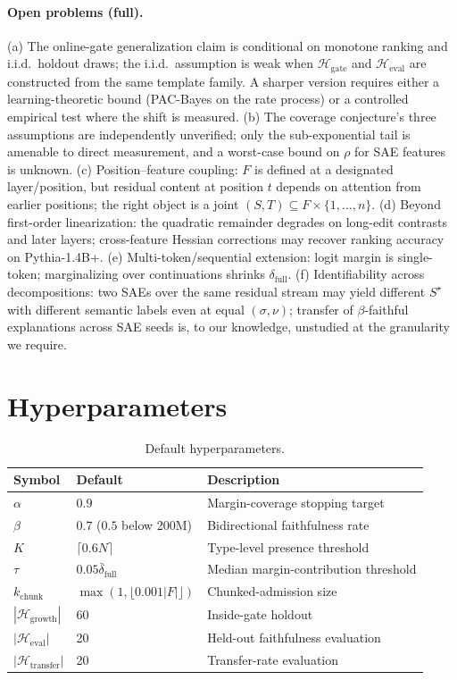 \documentclass[10pt]{article}
\begin{document}
\paragraph{Open problems (full).} (a) The online-gate generalization claim is conditional on monotone ranking and i.i.d.\ holdout draws; the i.i.d.\ assumption is weak when $\mathcal{H}_{\text{gate}}$ and $\mathcal{H}_{\text{eval}}$ are constructed from the same template family. A sharper version requires either a learning-theoretic bound (PAC-Bayes on the rate process) or a controlled empirical test where the shift is measured. (b) The coverage conjecture's three assumptions are independently unverified; only the sub-exponential tail is amenable to direct measurement, and a worst-case bound on $\rho$ for SAE features is unknown. (c) Position--feature coupling: $F$ is defined at a designated layer/position, but residual content at position $t$ depends on attention from earlier positions; the right object is a joint $(S, T) \subseteq F \times \{1, \dots, n\}$. (d) Beyond first-order linearization: the quadratic remainder degrades on long-edit contrasts and later layers; cross-feature Hessian corrections may recover ranking accuracy on Pythia-1.4B+. (e) Multi-token/sequential extension: logit margin is single-token; marginalizing over continuations shrinks $\delta_{\text{full}}$. (f) Identifiability across decompositions: two SAEs over the same residual stream may yield different $S^\star$ with different semantic labels even at equal $(\sigma, \nu)$; transfer of $\beta$-faithful explanations across SAE seeds is, to our knowledge, unstudied at the granularity we require.

\section{Hyperparameters}
\label{app:hyperparams}

\begin{table}[h]
\centering
\caption{Default hyperparameters.}
\label{tab:hyperparams}
\begin{tabular}{lll}
\toprule
Symbol & Default & Description \\
\midrule
$\alpha$ & $0.9$ & Margin-coverage stopping target \\
$\beta$ & $0.7$ ($0.5$ below 200M) & Bidirectional faithfulness rate \\
$K$ & $\lceil 0.6 N \rceil$ & Type-level presence threshold \\
$\tau$ & $0.05 \bar\delta_{\text{full}}$ & Median margin-contribution threshold \\
$k_{\text{chunk}}$ & $\max(1, \lfloor 0.001 |F| \rfloor)$ & Chunked-admission size \\
$|\mathcal{H}_{\text{growth}}|$ & 60 & Inside-gate holdout \\
$|\mathcal{H}_{\text{eval}}|$ & 20 & Held-out faithfulness evaluation \\
$|\mathcal{H}_{\text{transfer}}|$ & 20 & Transfer-rate evaluation \\
\bottomrule
\end{tabular}
\end{table}
\end{document}
